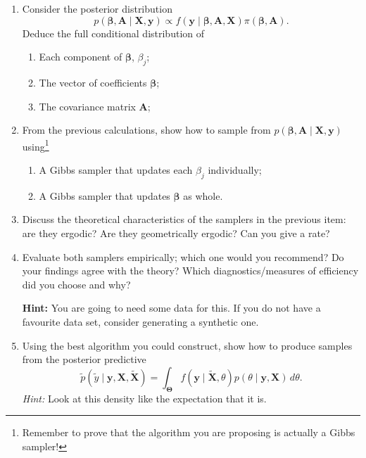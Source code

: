 \documentclass[a4paper,10pt, notitlepage]{report}
\newcommand{\bX}{ \boldsymbol{X}} %
\newcommand{\by}{ \boldsymbol{y} } %
\newcommand{\bb}{ \boldsymbol{\beta} }
\newcommand{\ba}{ \boldsymbol{A} }
\begin{document}
\begin{enumerate}
 \item Consider the posterior distribution
 \begin{equation*}
     p\left(\bb, \ba \mid \bX, \by \right) \propto f\left(\by \mid \bb, \ba, \bX \right)\pi\left(\bb, \ba\right).
 \end{equation*}
 Deduce the full conditional distribution of
 \begin{enumerate}
     \item Each component of $\bb$, $\beta_j$;
     \item The vector of coefficients $\bb$;
     \item The covariance matrix $\ba$;
 \end{enumerate}
 \item From the previous calculations, show how to sample from $p\left(\bb, \ba \mid \bX, \by \right)$ using\footnote{Remember to prove that the algorithm you are proposing is actually a Gibbs sampler!} 
 \begin{enumerate}
     \item A Gibbs sampler that updates each $\beta_j$ individually;
     \item A Gibbs sampler that updates $\bb$ as whole.
 \end{enumerate}
 \item Discuss the theoretical characteristics of the samplers in the previous item: are they ergodic? Are they geometrically ergodic? Can you give a rate?
 \item Evaluate both samplers empirically; which one would you recommend? Do your findings agree with the theory? Which diagnostics/measures of efficiency did you choose and why?

\textbf{Hint:} You are going to need some data for this. If you do not have a favourite data set, consider generating a synthetic one.
 
 \item Using the best algorithm you could construct, show how to produce samples from the posterior predictive
\begin{equation*}
    \tilde{p}(\tilde{y} \mid \boldsymbol{y}, \bX, \tilde{\bX}) = \int_{\boldsymbol{\Theta}} f(\by \mid \tilde{\bX}, \theta) p(\theta \mid \by, \bX)\,d\theta.
\end{equation*}
 \textit{Hint:} Look at this density like the expectation that it is.
 \end{enumerate}
% 
% 
% 
\end{document}
